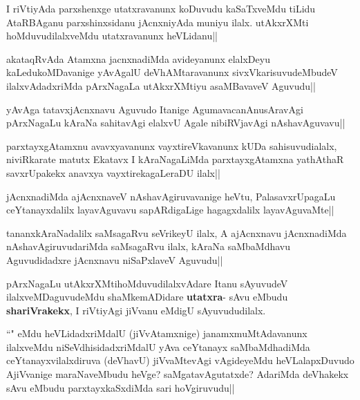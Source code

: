 \begin{artha}
I riVtiyAda parxshenxge utatxravanunx koDuvudu kaSaTxveMdu tiLidu AtaRBAganu 
parxshinxsidanu jAcnxniyAda muniyu ilalx. utAkxrXMti hoMduvudilalxveMdu utatxravanunx 
heVLidanu||
\end{artha}

\begin{artha}
akataqRvAda Atamxna jacnxnadiMda avideyanunx elalxDeyu kaLedukoMDavanige yAvAgalU deVhAMtaravanunx sivxVkarisuvudeMbudeV ilalxvAdadxriMda pArxNagaLa utAkxrXMtiyu asaMBavaveV Aguvudu||
\end{artha}

\begin{artha}
yAvAga tatavxjAcnxnavu Aguvudo Itanige AgumavacanAnusAravAgi pArxNagaLu kAraNa sahitavAgi elalxvU Agale nibiRVjavAgi nAshavAguvavu||
\end{artha}

\begin{artha}
parxtayxgAtamxnu avavxyavanunx vayxtireVkavanunx kUDa sahisuvudialalx, niviRkarate matutx Ekatavx I kAraNagaLiMda parxtayxgAtamxna yathAthaR savxrUpakekx anavxya vayxtirekagaLeraDU ilalx||
\end{artha}


\begin{artha}
jAcnxnadiMda ajAcnxnaveV nAshavAgiruvavanige heVtu, PalasavxrUpagaLu ceYtanayxdalilx 
layavAguvavu sapARdigaLige hagagxdalilx layavAguvaMte||
\end{artha}

\begin{artha}
tananxkAraNadalilx saMsagaRvu seVrikeyU ilalx, A  ajAcnxnavu jAcnxnadiMda 
nAshavAgiruvudariMda saMsagaRvu ilalx, kAraNa saMbaMdhavu Aguvudidadxre jAcnxnavu 
niSaPxlaveV Aguvudu||
\end{artha}


\begin{artha}
pArxNagaLu utAkxrXMtihoMduvudilalxvAdare Itanu sAyuvudeV ilalxveMDaguvudeMdu shaMkemADidare \textbf{utatxra}- sAvu eMbudu \textbf{shariVrakekx}, I riVtiyAgi jiVvanu eMdigU sAyuvududilalx. 
\end{artha}


\begin{artha}
``\stext" eMdu heVLidadxriMdalU (jiVvAtamxnige) janamxmuMtAdavanunx ilalxveMdu 
niSeVdhisidadxriMdalU yAva ceYtanayx saMbaMdhadiMda ceYtanayxvilalxdiruva (deVhavU) 
jiVvaMtevAgi vAgideyeMdu heVLalapxDuvudo AjiVvanige maraNaveMbudu heVge? 
saMgatavAgutatxde? AdariMda deVhakekx sAvu eMbudu parxtayxkaSxdiMda sari hoVgiruvudu||
\end{artha}

